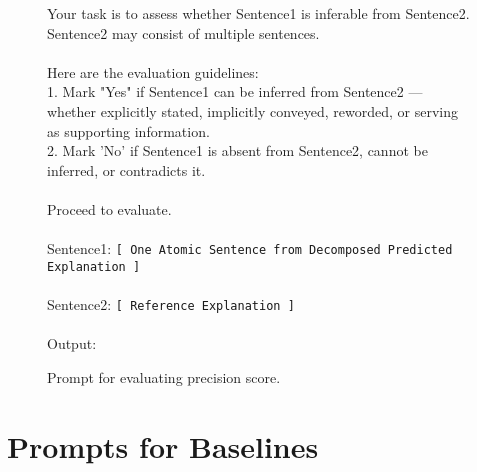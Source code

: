 \begin{figure*}[t]
\small
\begin{tcolorbox}[
    title=Prompt for Evaluating Precision Score,
    colback=white,
    colframe=MidnightBlue,
    arc=0pt,        %
    outer arc=0pt,  %
]

Your task is to assess whether \text{[}Sentence1\text{]} is inferable from \text{[}Sentence2\text{]}. \text{[}Sentence2\text{]} may consist of multiple sentences.\\
\\
Here are the evaluation guidelines:\\
1. Mark "Yes" if \text{[}Sentence1\text{]} can be inferred from \text{[}Sentence2\text{]} — whether explicitly stated, implicitly conveyed, reworded, or serving as supporting information.\\
2. Mark 'No' if \text{[}Sentence1\text{]} is absent from \text{[}Sentence2\text{]}, cannot be inferred, or contradicts it.\\
\\
Proceed to evaluate. \\
\\
\text{[}Sentence1\text{]}: \texttt{[ One Atomic Sentence from Decomposed Predicted Explanation ]}\\
\\
\text{[}Sentence2\text{]}: \texttt{[ Reference Explanation ]}\\
\\
\text{[}Output\text{]}:


\end{tcolorbox}
\caption{Prompt for evaluating precision score.} %
\label{fig:precision-prompt}
\end{figure*}

\section{Prompts for Baselines}
\label{app:base-prompts}


